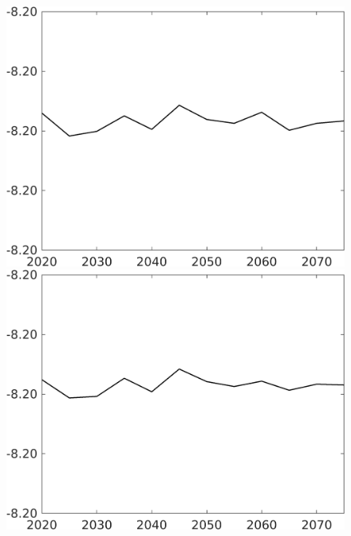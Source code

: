 \documentclass[12pt]{article}
\begin{document}
\begin{figure}
\begin{minipage}[]{0.32\textwidth}
	\end{minipage}	
	\begin{minipage}[]{0.32\textwidth}
		\includegraphics[width=1\textwidth]{../../codding_model/own_basedOnFried/optimalPol_010922_revision/figures/all_13Sept22/CompTaul_Equlab_LFBAUPer_Reg0_wsf_spillover0_nsk1_xgr0_knspil0_sep1_countec0_GovRev0_etaa0.79.png}
	\end{minipage}	
	\begin{minipage}[]{0.32\textwidth}
		\includegraphics[width=1\textwidth]{../../codding_model/own_basedOnFried/optimalPol_010922_revision/figures/all_13Sept22/CompTaul_Equlab_LFBAUPer_Reg0_wsg_spillover0_nsk1_xgr0_knspil0_sep1_countec0_GovRev0_etaa0.79.png}

\end{minipage}
\end{figure}
\end{document}

